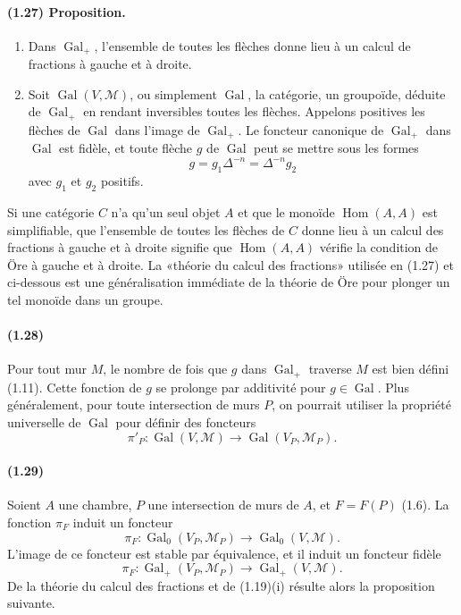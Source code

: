 \documentclass[10pt,a4paper]{article}
\begin{document}
\paragraph{(1.27) Proposition.}
\begin{enumerate}[label=(\roman*)]
\item Dans \(\operatorname{Gal}_+\), l'ensemble de toutes les flèches donne lieu à un calcul de fractions à gauche et à droite.
\item Soit \(\operatorname{Gal}(V,\mathcal M)\), ou simplement \(\operatorname{Gal}\), la catégorie, un groupoïde, déduite de \(\operatorname{Gal}_+\) en rendant inversibles toutes les flèches. Appelons positives les flèches de \(\operatorname{Gal}\) dans l'image de \(\operatorname{Gal}_+\). Le foncteur canonique de \(\operatorname{Gal}_+\) dans \(\operatorname{Gal}\) est fidèle, et toute flèche \(g\) de \(\operatorname{Gal}\) peut se mettre sous les formes
\[
g=g_1\Delta^{-n}=\Delta^{-n}g_2
\]
avec \(g_1\) et \(g_2\) positifs.
\end{enumerate}
Si une catégorie \(C\) n'a qu'un seul objet \(A\) et que le monoïde \(\operatorname{Hom}(A,A)\) est simplifiable, que l'ensemble de toutes les flèches de \(C\) donne lieu à un calcul des fractions à gauche et à droite signifie que \(\operatorname{Hom}(A,A)\) vérifie la condition de Öre à gauche et à droite. La «théorie du calcul des fractions» utilisée en (1.27) et ci-dessous est une généralisation immédiate de la théorie de Öre pour plonger un tel monoïde dans un groupe.

\paragraph{(1.28)} Pour tout mur \(M\), le nombre de fois que \(g\) dans \(\operatorname{Gal}_+\) traverse \(M\) est bien défini (1.11). Cette fonction de \(g\) se prolonge par additivité pour \(g\in\operatorname{Gal}\). Plus généralement, pour toute intersection de murs \(P\), on pourrait utiliser la propriété universelle de \(\operatorname{Gal}\) pour définir des foncteurs
\[
\pi'_P:\operatorname{Gal}(V,\mathcal M)\longrightarrow \operatorname{Gal}(V_P,\mathcal M_P).
\]

\paragraph{(1.29)} Soient \(A\) une chambre, \(P\) une intersection de murs de \(A\), et \(F=F(P)\) (1.6). La fonction \(\pi_F\) induit un foncteur
\[
\tag{1.29.1}
\pi_F:\operatorname{Gal}_0(V_P,\mathcal M_P)\longrightarrow\operatorname{Gal}_0(V,\mathcal M).
\]
L'image de ce foncteur est stable par équivalence, et il induit un foncteur fidèle
\[
\tag{1.29.2}
\pi_F:\operatorname{Gal}_+(V_P,\mathcal M_P)\longrightarrow\operatorname{Gal}_+(V,\mathcal M).
\]
De la théorie du calcul des fractions et de (1.19)(i) résulte alors la proposition suivante.
\end{document}
